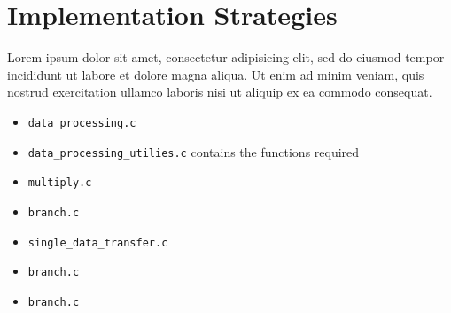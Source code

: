 \documentclass[11pt]{article}
\begin{document}
\section{Implementation Strategies}

Lorem ipsum dolor sit amet, consectetur adipisicing elit, sed do eiusmod tempor
incididunt ut labore et dolore magna aliqua. Ut enim ad minim veniam, quis
nostrud exercitation ullamco laboris nisi ut aliquip ex ea commodo consequat.

\begin{itemize}
    \item \texttt{data\_processing.c}
    \item \texttt{data\_processing\_utilies.c} contains the functions required 
    \item \texttt{multiply.c}
    \item \texttt{branch.c}
    \item \texttt{single_data_transfer.c}
    \item \texttt{branch.c}
    \item \texttt{branch.c}
\end{itemize}
\end{document}
